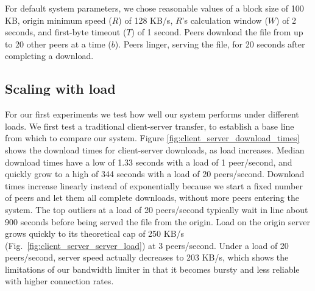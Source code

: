 For default system parameters, we chose reasonable values 
of a block size of 100 KB, origin minimum speed ($R$) of 128 KB/s, $R$'s calculation window ($W$) 
of 2 seconds, and first-byte timeout ($T$) of 1 second.  Peers download the file from up to 20 other peers at a time ($b$).
Peers linger, serving the file, for 20 seconds after completing a download.

\subsection{Scaling with load}

For our first experiments we test how well our system performs under different loads.
We first test a traditional client-server transfer, to establish a base line from which to compare 
our system. Figure \ref{fig:client_server_download_times} shows the download times for client-server 
downloads, as load increases.  Median download times have a low of 1.33 seconds with a load of 1 peer/second,
and quickly grow to a high of 344 seconds with a load of 20 peers/second. Download times increase linearly instead 
of exponentially because we start a fixed number of peers and let them all complete downloads, without more peers
entering the system. 
The top outliers at a load of 20 peers/second typically wait in line about 900 seconds before 
being served the file from the origin. Load on the origin server grows quickly to its 
theoretical cap of 250 KB/s (Fig.~\ref{fig:client_server_server_load}) 
at 3 peers/second. Under a load of 20 peers/second, server speed actually decreases to 203 KB/s, which 
shows the limitations of our bandwidth limiter in that it becomes bursty and less reliable with higher connection rates. 

